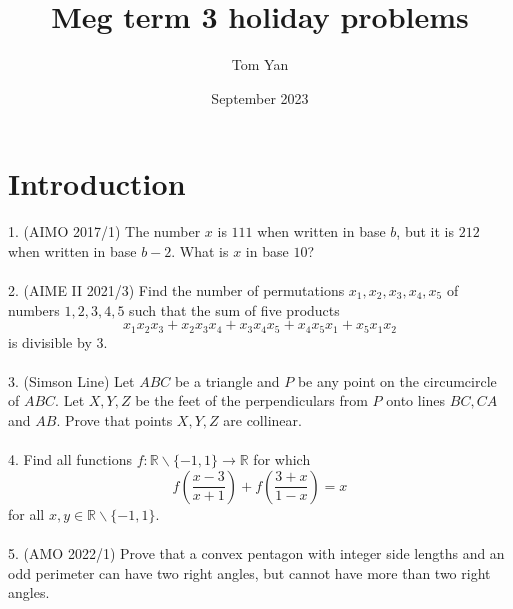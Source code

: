 \documentclass{article}
\title{Meg term 3 holiday problems}
\author{Tom Yan}
\date{September 2023}
\begin{document}
\maketitle

\section{Introduction}
1. (AIMO 2017/1) The number $x$ is $111$ when written in base $b$, but it is $212$ when written in base $b-2$. What is $x$ in base $10$?  \\\\
2. (AIME II 2021/3) Find the number of permutations $x_1, x_2, x_3, x_4, x_5$ of numbers $1, 2, 3, 4, 5$ such that the sum of five products\[x_1x_2x_3 + x_2x_3x_4 + x_3x_4x_5 + x_4x_5x_1 + x_5x_1x_2\]is divisible by $3$.\\\\
3. (Simson Line) Let $ABC$ be a triangle and $P$ be any point on the circumcircle of $ABC$. Let $X, Y, Z$ be the feet of the perpendiculars from $P$ onto lines $BC, CA$ and $AB$. Prove that points $X, Y, Z$ are collinear. \\\\
4. Find all functions $f: \mathbb{R} \backslash \{-1, 1\} \rightarrow \mathbb{R} $ for which $$f(\frac{x-3}{x+1})+f(\frac{3+x}{1-x})=x$$ for all $x,y \in \mathbb{R} \backslash \{-1, 1\}$.  \\\\
5. (AMO 2022/1) Prove that a convex pentagon with integer side lengths and an odd perimeter can have two right angles, but cannot have more than two right angles.  
\newpage 
\end{document}
